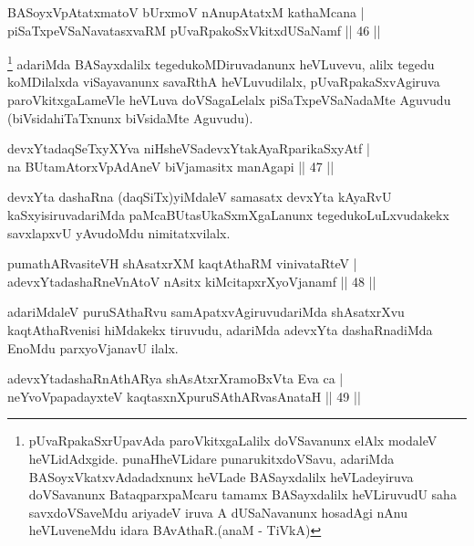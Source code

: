 \begin{shl}
BASoyxVpAtatxmatoV bUrxmoV nAnupAtatxM kathaMcana |\\
piSaTxpeVSaNavatasxvaRM pUvaRpakoSxVkitxdUSaNamf \hfill || 46 ||
\end{shl}

\begin{artha}
\footnote{pUvaRpakaSxrUpavAda paroVkitxgaLalilx doVSavanunx elAlx modaleV heVLidAdxgide. punaHheVLidare punarukitxdoVSavu, adariMda BASoyxVkatxvAdadadxnunx heVLade BASayxdalilx heVLadeyiruva doVSavanunx BataqparxpaMcaru tamamx BASayxdalilx heVLiruvudU saha savxdoVSaveMdu ariyadeV iruva A dUSaNavanunx hosadAgi nAnu heVLuveneMdu idara BAvAthaR.(anaM - TiVkA)} adariMda BASayxdalilx tegedukoMDiruvadanunx heVLuvevu, alilx tegedu koMDilalxda viSayavanunx savaRthA heVLuvudilalx, pUvaRpakaSxvAgiruva paroVkitxgaLameVle heVLuva doVSagaLelalx piSaTxpeVSaNadaMte Aguvudu (biVsidahiTaTxnunx biVsidaMte Aguvudu).
\end{artha}


\begin{shl}
devxYtadaqSeTxyXYva niHsheVSadevxYtakAyaRparikaSxyAtf |\\
na BUtamAtorxVpAdAneV biVjamasitx manAgapi \hfill || 47 ||
\end{shl}

\begin{artha}
devxYta dashaRna (daqSiTx)yiMdaleV samasatx devxYta kAyaRvU kaSxyisiruvadariMda paMcaBUtasUkaSxmXgaLanunx tegedukoLuLxvudakekx savxlapxvU yAvudoMdu nimitatxvilalx.
\end{artha}

\begin{shl}
pumathARvasiteVH shAsatxrXM kaqtAthaRM vinivataRteV |\\
adevxYtadashaRneVnAtoV nAsitx kiMcitapxrXyoVjanamf \hfill || 48 ||
\end{shl}

\begin{artha}
adariMdaleV puruSAthaRvu samApatxvAgiruvudariMda shAsatxrXvu kaqtAthaRvenisi hiMdakekx tiruvudu, adariMda adevxYta dashaRnadiMda EnoMdu parxyoVjanavU ilalx.
\end{artha}

\begin{shl}
adevxYtadashaRnAthARya shAsAtxrXramoBxV\s ta Eva ca |\\
neYvoVpapadayxteV kaqtasxnXpuruSAthARvasAnataH \hfill || 49 ||
\end{shl}

